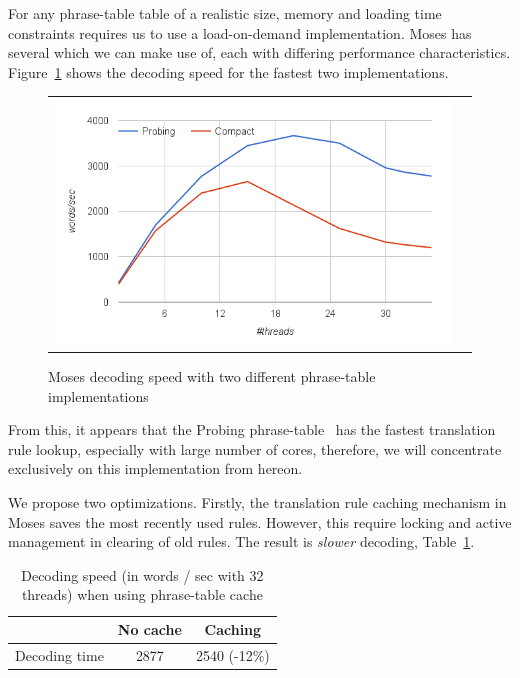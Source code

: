 \documentclass[]{article}
\begin{document}
For any phrase-table table of a realistic size, memory and loading time constraints requires us to use a load-on-demand implementation. Moses has several which we can make use of, each with differing performance characteristics. Figure~\ref{fig:moses-phrase-tables-time} shows the decoding speed for the fastest two implementations.
\begin{figure}[h]
\centering
\begin{tabular}{cc}
{\includegraphics[scale=0.4]{moses-phrase-table.png}} 
\end{tabular}
\caption{Moses decoding speed with two different phrase-table implementations}
\label{fig:moses-phrase-tables-time}
\end{figure} 
From this, it appears that the Probing phrase-table~\citep{Bogoychev.probing.2016} has the fastest translation rule lookup, especially with large number of cores, therefore, we will concentrate exclusively on this implementation from hereon.

We propose two optimizations. Firstly, the translation rule caching mechanism in Moses saves the most recently used rules. However, this require locking and active management in clearing of old rules. The result is \emph{slower} decoding, Table~\ref{tab:phrase-table-cache}. 
\begin{table}[h]
\small
\begin{center}
\begin{tabular}{|l|c|c|} \hline
		& No cache	& Caching \\ \hline
Decoding time  	& 2877	& 2540 (-12\%) \\ \hline
\end{tabular}
\end{center}
\caption{Decoding speed (in words / sec with 32 threads) when using phrase-table cache}
\label{tab:phrase-table-cache}
\end{table}
\end{document}
